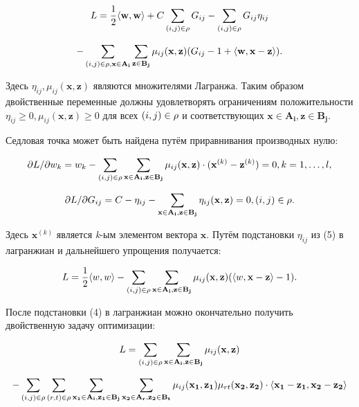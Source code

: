 \documentclass[12pt,a4paper,oneside]{article}
\begin{document}
\[
L = \frac{1}{2} \langle \mathbf{w}, \mathbf{w} \rangle + C \sum \limits_{(i, j) \in \mathrm{\rho}} G_{ij} - \sum \limits_{(i, j) \in \mathrm{\rho}} G_{ij} \eta_{ij}
\]

\[
- \sum \limits_{(i, j) \in \mathrm{\rho}, \mathbf{x} \in \mathbf{A_i}} \sum \limits_{\mathbf{z} \in \mathbf{B_j}} \mu_{ij}(\mathbf{x}, \mathbf{z}) (G_{ij} - 1 + \langle \mathbf{w}, \mathbf{x} - \mathbf{z} \rangle).
\]

\par
Здесь \(\eta_{ij}, \mu_{ij}(\mathbf{x}, \mathbf{z})\) являются множителями Лагранжа. 
Таким образом двойственные переменные должны удовлетворять ограничениям положительности \(\eta_{ij} \geq 0, \mu_{ij} (\mathbf{x}, \mathbf{z}) \geq 0\) для всех \((i, j) \in \mathrm{\rho}\) и соответствующих \(\mathbf{x} \in \mathbf{A_i}, \mathbf{z} \in \mathbf{B_j}\). 

\par
Седловая точка может быть найдена путём приравнивания производных нулю:

\[
\partial L / \partial w_k = w_k - \sum \limits_{(i, j) \in \mathrm{\rho}} \sum \limits_{\mathbf{x} \in \mathbf{A_i}, \mathbf{z} \in \mathbf{B_j}} \mu_{ij} (\mathbf{x}, \mathbf{z}) \cdot (\mathbf{x}^{(k)} - \mathbf{z}^{(k)}) = 0, k = 1, \dots, l,
\]

\[
\partial L / \partial G_{ij} = C - \eta_{ij} - \sum \limits_{\mathbf{x} \in \mathbf{A_i}, \mathbf{z} \in \mathbf{B_j}} \eta_{ij}(\mathbf{x}, \mathbf{z}) = 0, (i, j) \in \mathrm{\rho}. 
\]

\par
Здесь \(\mathbf{x}^{(k)}\) является \emph{k}-ым элементом вектора \(\mathbf{x}\). 
Путём подстановки \(\eta_{ij}\) из (5) в лагранжиан и дальнейшего упрощения получается:

\[
L = \frac{1}{2} \langle w, w \rangle - \sum \limits_{(i, j) \in \mathrm{\rho}} \sum \limits_{\mathbf{x} \in \mathbf{A_i}, \mathbf{z} \in \mathbf{B_j}} \mu_{ij} (\mathbf{x}, \mathbf{z}) (\langle w, \mathbf{x} - \mathbf{z} \rangle - 1).
\]

\par
После подстановки (4) в лагранжиан можно окончательно получить двойственную задачу оптимизации:

\[
L = \sum \limits_{(i, j) \in \mathrm{\rho}} \sum \limits_{\mathbf{x} \in \mathbf{A_i}, \mathbf{z} \in \mathbf{B_j}} \mu_{ij} (\mathbf{x}, \mathbf{z})
\]

\[
- \sum \limits_{(i, j) \in \mathrm{\rho}} \sum \limits_{(r, t) \in \mathrm{\rho}} \sum \limits_{\mathbf{x_1} \in \mathbf{A_i}, \mathbf{z_1} \in \mathbf{B_j}} \sum \limits_{\mathbf{x_2} \in \mathbf{A_r}, \mathbf{z_2} \in \mathbf{B_t}} \mu_{ij} (\mathbf{x_1}, \mathbf{z_1}) \mu_{rt} (\mathbf{x_2}, \mathbf{z_2}) \cdot \langle \mathbf{x_1} - \mathbf{z_1}, \mathbf{x_2} - \mathbf{z_2} \rangle
\]
\end{document}
